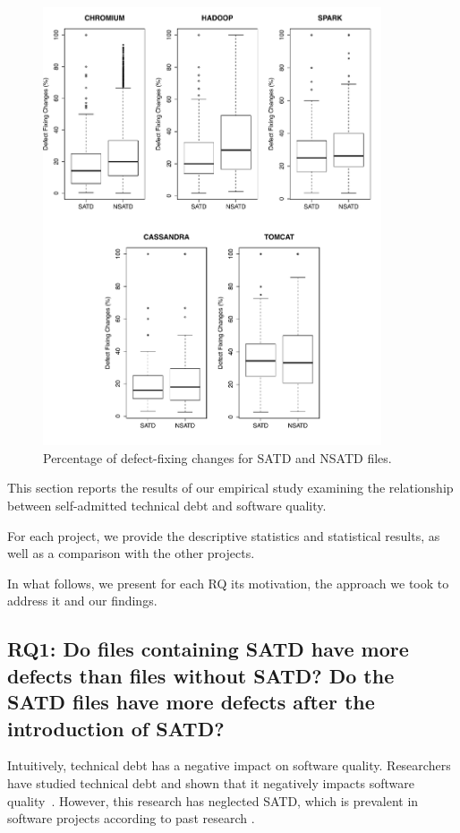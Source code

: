 \begin{figure}[tb]
	\centering
	\includegraphics[width=100mm]{figures/chapter3/rq1_correction}
	\caption{Percentage of defect-fixing changes for SATD and NSATD files.}
	\label{figure:number_of_fixing_changes_TD_vs_NTD}
\end{figure}

This section reports the results of our empirical study examining the relationship between self-admitted technical debt and software quality. 

For each project, we provide the descriptive statistics and statistical results, as well as a comparison with the other projects. 



In what follows, we present for each RQ its motivation, the approach we took to address it and our findings.


\subsection*{RQ1: Do files containing SATD have more defects than files without SATD? Do the SATD files have more defects after the introduction of SATD?}

 Intuitively, technical debt has a negative impact on software quality. Researchers have studied technical debt and shown that it negatively impacts software quality~\cite{zazworka2011investigating}. However, this research has neglected SATD, which is prevalent in software projects according to past research \cite{ICSM_PotdarS14}.


